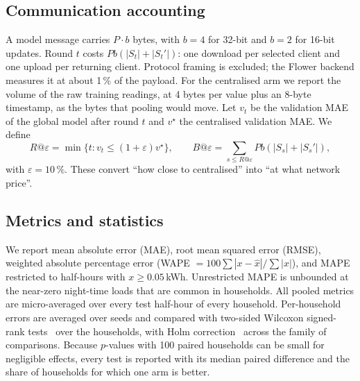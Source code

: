 \subsection{Communication accounting}\label{sec:comm}
A model message carries $P\cdot b$ bytes, with $b=4$ for 32-bit and $b=2$ for 16-bit updates. Round $t$ costs
$P b(|S_t|+|S_t'|)$: one download per selected client and one upload per returning client. Protocol framing is
excluded; the Flower backend measures it at about 1\,\% of the payload. For the centralised arm we report the volume
of the raw training readings, at 4 bytes per value plus an 8-byte timestamp, as the bytes that pooling would move.
Let $v_t$ be the validation MAE of the global model after round $t$ and $v^\star$ the centralised validation MAE.
We define
\begin{equation}
R@\varepsilon=\min\{t: v_t\le(1+\varepsilon)v^\star\},\qquad B@\varepsilon=\sum_{s\le R@\varepsilon}P b(|S_s|+|S_s'|),
\end{equation}
with $\varepsilon=10\,\%$. These convert ``how close to centralised'' into ``at what network price''.

\subsection{Metrics and statistics}
We report mean absolute error (MAE), root mean squared error (RMSE), weighted absolute percentage error
(WAPE $=100\sum|x-\hat{x}|/\sum|x|$), and MAPE restricted to half-hours with $x\ge0.05$\,kWh. Unrestricted MAPE is
unbounded at the near-zero night-time loads that are common in households. All pooled metrics are micro-averaged
over every test half-hour of every household. Per-household errors are averaged over seeds and compared with
two-sided Wilcoxon signed-rank tests~\cite{wilcoxon1945} over the \NumHouseholds{} households, with Holm
correction~\cite{holm1979} across the family of comparisons. Because $p$-values with 100 paired households can be
small for negligible effects, every test is reported with its median paired difference and the share of households
for which one arm is better.
